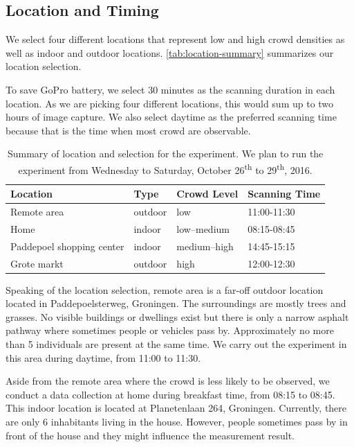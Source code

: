 \subsection{Location and Timing} %
\label{sub:location_and_timing}
We select four different locations that represent low and high crowd densities as well as indoor and outdoor locations. \autoref{tab:location-summary} summarizes our location selection.

To save GoPro battery, we select 30 minutes as the scanning duration in each location. As we are picking four different locations, this would sum up to two hours of image capture. We also select daytime as the preferred scanning time because that is the time when most crowd are observable.

\begin{table}[]
\centering
\caption{Summary of location and selection for the experiment. We plan to run the experiment from Wednesday to Saturday, October 26\textsuperscript{th} to 29\textsuperscript{th}, 2016.}
\label{tab:location-summary}
\begin{tabular}{llll} \toprule
Location                  & Type    & Crowd Level & Scanning Time \\ \midrule
Remote area               & outdoor & low         & 11:00-11:30   \\
Home                      & indoor  & low--medium  & 08:15-08:45   \\
Paddepoel shopping center & indoor  & medium--high & 14:45-15:15   \\
Grote markt               & outdoor & high        & 12:00-12:30  \\ \bottomrule
\end{tabular}
\end{table}


Speaking of the location selection, remote area is a far-off outdoor location located in Paddepoelsterweg, Groningen. The surroundings are mostly trees and grasses. No visible buildings or dwellings exist but there is only a narrow asphalt pathway where sometimes people or vehicles pass by. Approximately no more than 5 individuals are present at the same time. We carry out the experiment in this area during daytime, from 11:00 to 11:30.

Aside from the remote area where the crowd is less likely to be observed, we conduct a data collection at home during breakfast time, from 08:15 to 08:45. This indoor location is located at Planetenlaan 264, Groningen. Currently, there are only 6 inhabitants living in the house. However, people sometimes pass by in front of the house and they might influence the measurement result.

